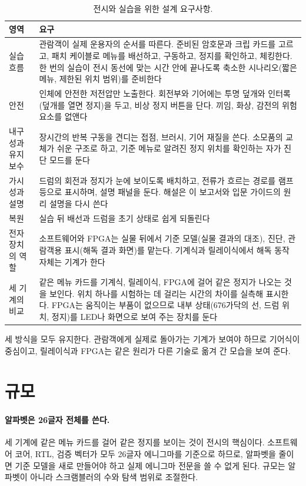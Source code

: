 \begin{table}[ht]
\centering
\caption{전시와 실습을 위한 설계 요구사항.}
\label{tab:exhibit}
\small
\begin{tabularx}{\linewidth}{>{\raggedright\arraybackslash}p{26mm}>{\raggedright\arraybackslash}X}
\toprule
영역 & 요구 \\
\midrule
실습 흐름 & 관람객이 실제 운용자의 순서를 따른다. 준비된 암호문과 크립 카드를 고르고, 패치 케이블로 메뉴를
  배선하고, 구동하고, 정지를 확인하고, 체킹한다. 한 번의 실습이 전시 동선에 맞는 시간 안에 끝나도록 축소한
  시나리오(짧은 메뉴, 제한된 위치 범위)를 준비한다 \\
안전 & 인체에 안전한 저전압만 노출한다. 회전부와 기어에는 투명 덮개와 인터록(덮개를 열면 정지)을 두고,
  비상 정지 버튼을 단다. 끼임, 화상, 감전의 위험 요소를 없앤다 \\
내구성과 유지보수 & 장시간의 반복 구동을 견디는 접점, 브러시, 기어 재질을 쓴다. 소모품의 교체가 쉬운 구조로
  하고, 기준 메뉴로 알려진 정지 위치를 확인하는 자가 진단 모드를 둔다 \\
가시성과 설명 & 드럼의 회전과 정지가 눈에 보이도록 배치하고, 전류가 흐르는 경로를 램프 등으로 표시하며,
  설명 패널을 둔다. 해설은 이 보고서와 입문 가이드의 원리 설명을 다시 쓴다 \\
복원 & 실습 뒤 배선과 드럼을 초기 상태로 쉽게 되돌린다 \\
전자 장치의 역할 & 소프트웨어와 FPGA는 실물 뒤에서 기준 모델(실물 결과의 대조), 진단,
  관람객용 표시(해독 결과 화면)를 맡는다. 기계식과 릴레이식에서 해독 동작 자체는 기계가 한다 \\
세 기계의 비교 & 같은 메뉴 카드를 기계식, 릴레이식, FPGA에 걸어 같은 정지가 나오는 것을 보인다. 위치 하나를
  시험하는 데 걸리는 시간의 차이를 실측해 표시한다. FPGA는 움직이는 부품이 없으므로 내부 상태(676가닥의 선,
  드럼 위치, 정지)를 LED나 화면으로 보여 주는 장치를 둔다 \\
\bottomrule
\end{tabularx}
\end{table}

세 방식을 모두 유지한다. 관람객에게 실제로 돌아가는 기계가 보여야 하므로 기어식이 중심이고, 릴레이식과
FPGA는 같은 원리가 다른 기술로 옮겨 간 모습을 보여 준다.

\section{규모}\label{sec:hw-scale}

\paragraph{알파벳은 26글자 전체를 쓴다.} 세 기계에 같은 메뉴 카드를 걸어 같은 정지를 보이는 것이 전시의
핵심이다. 소프트웨어 코어, RTL, 검증 벡터가 모두 26글자 에니그마를 기준으로 하므로, 알파벳을 줄이면 기준
모델을 새로 만들어야 하고 실제 에니그마 전문을 쓸 수 없게 된다. 규모는 알파벳이 아니라 스크램블러의 수와
탐색 범위로 조절한다.

